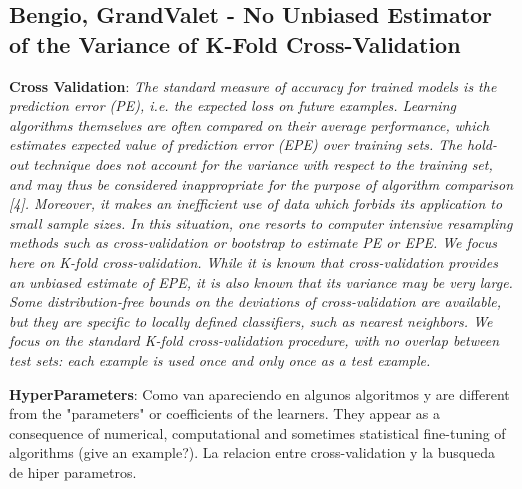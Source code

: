 \subsection{Bengio, GrandValet - No Unbiased Estimator of the Variance of K-Fold Cross-Validation}
\textbf{Cross Validation}: 
\textit{The standard measure of accuracy for trained models is the prediction error (PE), i.e. the expected loss on future examples. Learning algorithms themselves are often compared on their average performance, which estimates expected value of prediction error (EPE) over training sets.
The hold-out technique does not account for the variance with respect to the training set, and may thus be considered inappropriate for the purpose of algorithm comparison [4]. Moreover, it makes an inefficient use of data which forbids its application to small sample sizes. In this situation, one resorts to computer intensive resampling methods such as cross-validation or bootstrap to estimate PE or EPE. We focus here on K-fold cross-validation. While it is known that cross-validation provides an unbiased estimate of EPE, it is also known that its variance may be very large.
Some distribution-free bounds on the deviations of cross-validation are available, but they are specific to locally defined classifiers, such as nearest neighbors.
We focus on the standard K-fold cross-validation procedure, with no overlap between test sets: each example is used once and only once as a test example.
}


\textbf{HyperParameters}:
Como van apareciendo en algunos algoritmos y are different from the "parameters" or coefficients of the learners. They appear as a consequence of numerical, computational and sometimes statistical fine-tuning of algorithms (give an example?). 
La relacion entre cross-validation y la busqueda de hiper parametros. 

\textit{}

\textit{}


